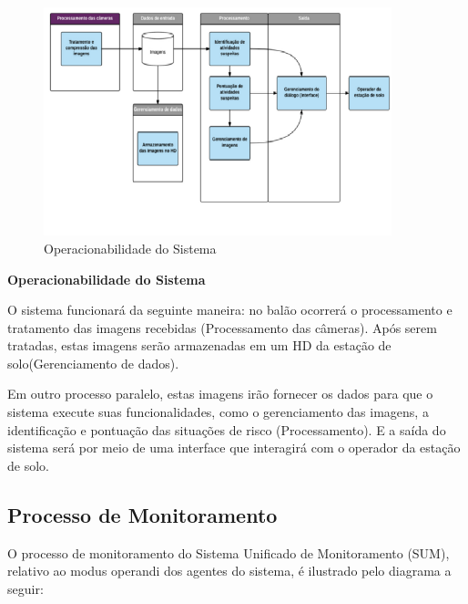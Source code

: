 \begin{figure}[htp]
\centering
\includegraphics[width=0.90\textwidth]{figuras/OperacionabilidadedoSistema}
\caption{Operacionabilidade do Sistema}
\label{img:Operacionabilidade do Sistema}
\end{figure}

\textbf{Operacionabilidade do Sistema}
\\\par 
O sistema funcionará da seguinte maneira: no balão ocorrerá o processamento e tratamento das imagens recebidas (Processamento das câmeras). Após serem tratadas, estas imagens serão armazenadas em um HD da estação de solo(Gerenciamento de dados).
\\\par
Em outro processo paralelo, estas imagens  irão fornecer os dados para que o sistema execute suas funcionalidades, como o gerenciamento das imagens, a identificação e pontuação das situações de risco (Processamento). E a saída do sistema será por meio de uma interface que interagirá com o operador da estação de solo.

\subsection{Processo de Monitoramento}
O processo de monitoramento do Sistema Unificado de Monitoramento (SUM), relativo ao modus operandi dos agentes do sistema, é ilustrado pelo diagrama a seguir:


